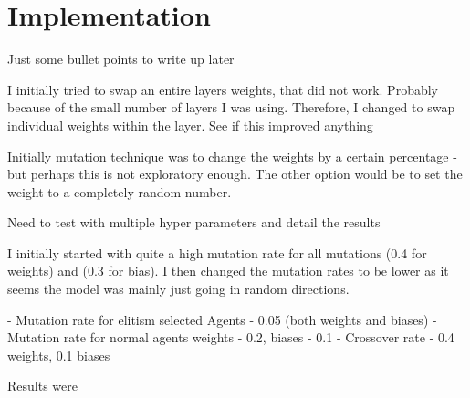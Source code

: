 \chapter{Implementation}

Just some bullet points to write up later

I initially tried to swap an entire layers weights, that did not work.  Probably because of the small number of layers I was using. Therefore, I changed to swap individual weights within the layer. See if this improved anything


Initially mutation technique was to change the weights by a certain percentage - but perhaps this is not exploratory enough. The other option would be to set the weight to a completely random number.

Need to test with multiple hyper parameters and detail the results

I initially started with quite a high mutation rate for all mutations (0.4 for weights) and (0.3 for bias). I then changed the mutation rates to be lower as it seems the model was mainly just going in random directions.

 - Mutation rate for elitism selected Agents - 0.05 (both weights and biases)
 - Mutation rate for normal agents weights - 0.2, biases - 0.1
 - Crossover rate - 0.4 weights, 0.1 biases

Results were
